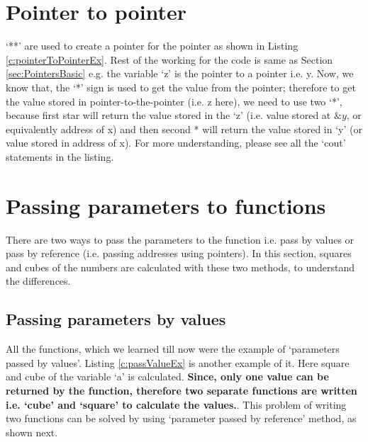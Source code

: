 

\section{Pointer to pointer}

`**' are used to create a pointer for the pointer as shown in Listing \ref{c:pointerToPointerEx}. Rest of the working for the code is same as Section \ref{sec:PointersBasic} e.g. the variable `z' is the pointer to a pointer i.e. y. Now, we know that, the `*' sign is used to get the value from the pointer; therefore to get the value stored in pointer-to-the-pointer (i.e. z here), we need to use two `*', because first star will return the value stored in the `z' (i.e. value stored at $\&y$, or equivalently address of x) and then second * will return the value stored in `y' (or value stored in address of x). For more understanding, please see all the `cout' statements in the listing. 
 


\section{Passing parameters to functions}
There are two ways to pass the parameters to the function i.e. pass by values or pass by reference (i.e. passing addresses using pointers). In this section, squares and cubes of the numbers are calculated with these two methods, to understand the differences.

\subsection{Passing parameters by values}
All the functions, which we learned till now were the example of `parameters passed by values'. Listing \ref{c:passValueEx} is another example of it. Here square and cube of the variable `a' is calculated. \textbf{Since, only one value can be returned by the function, therefore two separate functions are written i.e. `cube' and `square' to calculate the values.}. This problem of writing two functions can be solved by using `parameter passed by reference' method, as shown next.  


